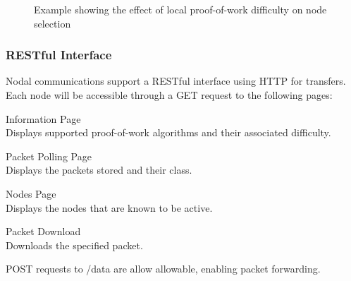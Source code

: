\begin{figure}[!hbpt]
				
				\caption{Example showing the effect of local proof-of-work difficulty on node selection}
				\label{fig:powmodule}
			\end{figure}
			
		\subsubsection*{RESTful Interface}
			Nodal communications support a RESTful interface using HTTP for transfers. Each node will be accessible through a GET request to the following pages:
			\begin{description}[topsep=-5pt,itemsep=-1ex,partopsep=2ex,parsep=1.5ex]
				\item[/] Information Page \\ Displays supported proof-of-work algorithms and their associated difficulty.
				\item[/poll/\textit{timestamp}] Packet Polling Page \\ Displays the packets stored and their class.
				\item[/nodes] Nodes Page \\ Displays the nodes that are known to be active.
				\item[/data/\textit{packetHash}] Packet Download \\ Downloads the specified packet.
			\end{description}
			
			POST requests to /data are allow allowable, enabling packet forwarding.
	
